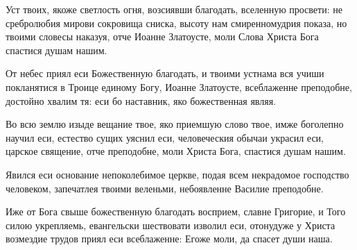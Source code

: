 \begin{mymulticols}
Уст твоих, якоже светлость огня, возсиявши благодать, вселенную просвети: не сребролюбия мирови сокровища сниска, высоту нам смиренномудрия показа, но твоими словесы наказуя, отче Иоанне Златоусте, моли Слова Христа Бога спастися душам нашим.


\slava

От небес приял еси Божественную благодать, и твоими устнама вся учиши покланятися в Троице единому Богу, Иоанне Златоусте, всеблаженне преподобне, достойно хвалим тя: еси бо наставник, яко божественная являя.

\inyne




Во всю землю изыде вещание твое, яко приемшую слово твое, имже боголепно научил еси, естество сущих уяснил еси, человеческия обычаи украсил еси, царское священие, отче преподобне, моли Христа Бога, спастися душам нашим.

\vspace{-\baselineskip}

\slava

Явился еси основание непоколебимое церкве, подая всем некрадомое господство человеком, запечатлея твоими веленьми, небоявленне Василие преподобне.

\inyne




Иже от Бога свыше божественную благодать восприем, славне Григорие, и Того силою укрепляемь, евангельски шествовати изволил еси, отонудуже у Христа возмездие трудов приял еси всеблаженне: Егоже моли, да спасет души наша.


\end{mymulticols}
